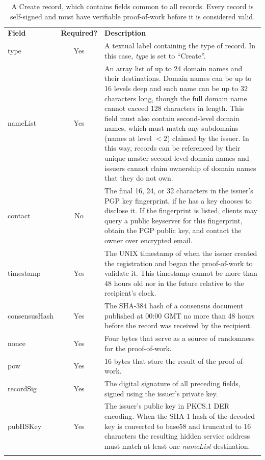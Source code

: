 \renewcommand{\arraystretch}{1.75} %
\begin{center}
    \begin{longtabu}{ | l | c | p{9.5cm} |}
    \hline
    \textbf{Field} & \textbf{Required?} & \textbf{Description} \\
    type & Yes & A textual label containing the type of record. In this case, \emph{type} is set to ``Create''. \\
    nameList & Yes & An array list of up to 24 domain names and their destinations.  Domain names can be up to 16 levels deep and each name can be up to 32 characters long, though the full domain name cannot exceed 128 characters in length. This field must also contain second-level domain names, which must match any subdomains (names at level $ < 2 $) claimed by the issuer. In this way, records can be referenced by their unique master second-level domain names and issuers cannot claim ownership of domain names that they do not own. \\
    contact & No & The final 16, 24, or 32 characters in the issuer's PGP key fingerprint, if he has a key chooses to disclose it. If the fingerprint is listed, clients may query a public keyserver for this fingerprint, obtain the PGP public key, and contact the owner over encrypted email. \\
	timestamp & Yes & The UNIX timestamp of when the issuer created the registration and began the proof-of-work to validate it. This timestamp cannot be more than 48 hours old nor in the future relative to the recipient's clock. \\
	consensusHash & Yes & The SHA-384 hash of a consensus document published at 00:00 GMT no more than 48 hours before the record was received by the recipient. \\
	nonce & Yes & Four bytes that serve as a source of randomness for the proof-of-work. \\
    pow & Yes & 16 bytes that store the result of the proof-of-work. \\
    recordSig & Yes & The digital signature of all preceding fields, signed using the issuer's private key. \\
    pubHSKey & Yes & The issuer's public key in PKCS.1 DER encoding. When the SHA-1 hash of the decoded key is converted to base58 and truncated to 16 characters the resulting hidden service address must match at least one \emph{nameList} destination.
    \\
    \hline
    \caption{A Create record, which contains fields common to all records. Every record is self-signed and must have verifiable proof-of-work before it is considered valid.}
    \end{longtabu}
	\label{table:createTable}
\end{center}



